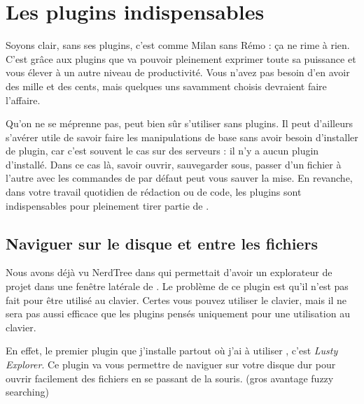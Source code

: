 \chapter{Les plugins indispensables}

Soyons clair, \vim sans ses plugins, c'est comme Milan sans Rémo : ça ne rime à rien. C'est grâce aux plugins que \vim va pouvoir pleinement exprimer toute sa puissance et vous élever à un autre niveau de productivité. Vous n'avez pas besoin d'en avoir des mille et des cents, mais quelques uns savamment choisis devraient faire l'affaire.

Qu'on ne se méprenne pas, \vim peut bien sûr s'utiliser sans plugins. Il peut d'ailleurs s'avérer utile de savoir faire les manipulations de base sans avoir besoin d'installer de plugin, car c'est souvent le cas sur des serveurs : il n'y a aucun plugin d'installé. Dans ce cas là, savoir ouvrir, sauvegarder sous, passer d'un fichier à l'autre avec les commandes de \vim par défaut peut vous sauver la mise. En revanche, dans votre travail quotidien de rédaction ou de code, les plugins sont indispensables pour pleinement tirer partie de \vim.

\section{Naviguer sur le disque et entre les fichiers}


Nous avons déjà vu NerdTree dans  qui permettait d'avoir un explorateur de projet dans une fenêtre latérale de \vim. Le problème de ce plugin est qu'il n'est pas fait pour être utilisé au clavier. Certes vous pouvez utiliser le clavier, mais il ne sera pas aussi efficace que les plugins pensés uniquement pour une utilisation au clavier.

En effet, le premier plugin que j'installe partout où j'ai à utiliser \vim, c'est \emph{Lusty Explorer}. Ce plugin va vous permettre de naviguer sur votre disque dur pour ouvrir facilement des fichiers en se passant de la souris. (gros avantage fuzzy searching)
